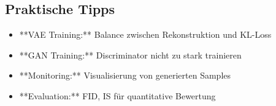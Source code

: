 ﻿\documentclass[12pt,a4paper]{article}
\begin{document}
\subsection*{Praktische Tipps}
\begin{itemize}
    \item **VAE Training:** Balance zwischen Rekonstruktion und KL-Loss
    \item **GAN Training:** Discriminator nicht zu stark trainieren
    \item **Monitoring:** Visualisierung von generierten Samples
    \item **Evaluation:** FID, IS für quantitative Bewertung
\end{itemize}
\end{document}
